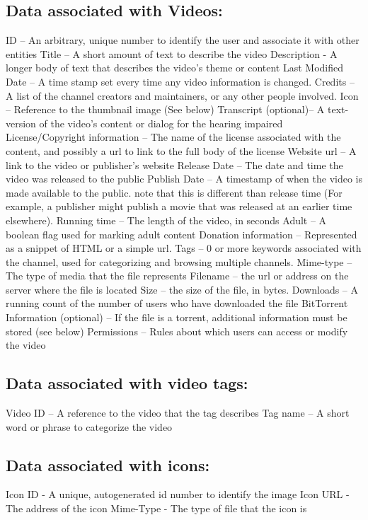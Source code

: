 \documentclass[a4paper,12pt]{report}
\begin{document}
\subsection{Data associated with Videos:}
ID – An arbitrary, unique number to identify the user and associate it with other entities
Title – A short amount of text to describe the video
Description - A longer body of text that describes the video's theme or content
Last Modified Date – A time stamp set every time any video information is changed.
Credits – A list of the channel creators and maintainers, or any other people involved.
Icon – Reference to the thumbnail image (See below)
Transcript (optional)– A text-version of the video's content or dialog for the hearing impaired
License/Copyright information – The name of the license associated with the content, and possibly a url to link to the full body of the license
Website url – A link to the video  or publisher's website
Release Date – The date and time the video was released to the public
Publish Date – A timestamp of when the video is made available to the public. note that this is different than release time (For example, a publisher might publish a movie that was released at an earlier time elsewhere).
Running time – The length of the video, in seconds
Adult – A boolean flag used for marking adult content
Donation information – Represented as a snippet of HTML or a simple url.
Tags – 0 or more keywords associated with the channel, used for categorizing and     browsing multiple channels.
Mime-type – The type of media that the file represents
Filename – the url or address on the server where the file is located
Size – the size of the file, in bytes.
Downloads – A running count of the number of users who have downloaded the file
BitTorrent Information (optional) – If the file is a torrent, additional information must be stored (see below)
Permissions – Rules about which users can access or modify the video

\subsection{Data associated with video tags:}
    Video ID – A reference to the video that the tag describes
    Tag name – A short word or phrase to categorize the video

\subsection{Data associated with icons:}
    Icon ID - A unique, autogenerated id number to identify the image
    Icon URL - The address of the icon
    Mime-Type - The type of file that the icon is
\end{document}
